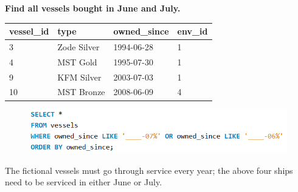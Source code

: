 \documentclass[a4paper]{article}
\begin{document}
\begin{flushleft}
    {\bf Find all vessels bought in June and July.}
    \begin{table}[!ht]
    \flushleft
    \begin{tabular}{|l|l|l|l|}
    \hline
        vessel\_id & type & owned\_since & env\_id \\ \hline
        3 & Zode Silver & 1994-06-28 & 1 \\ \hline
        4 & MST Gold & 1995-07-30 & 1 \\ \hline
        9 & KFM Silver & 2003-07-03 & 1 \\ \hline
        10 & MST Bronze & 2008-06-09 & 4 \\ \hline
    \end{tabular}
    \end{table}
    \begin{figure} [H]
        \flushleft
        \includegraphics[width=0.8\linewidth]{code/SQLownedSince.PNG}
        \label{fig:SQLownedSince}
    \end{figure}
    The fictional vessels must go through service every year; the above four ships need to be serviced in either June or July.
\end{flushleft}
\newpage
\end{document}
